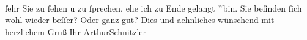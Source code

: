 \begin{ledgroupsized}[t]{13cm}
               ſehr Sie zu ſehen u zu ſprechen, ehe ich zu Ende gelangt \substVorne{}\textsuperscript{\textcolor{gray}{w}}\substDazwischen{}bin\substHinten{}. Sie befinden ſich wohl wieder beſſer? Oder ganz gut? Dies und aehnliches
               wünschend mit herzlichem Gruß Ihr\pend
           \pstart \spacefill\mbox{ArthurSchnitzler}\pend{}
         
         \endnumbering{}\end{ledgroupsized}  \newcommand{\dateiname}{L02245}\newcommand{\titel}{Arthur Schnitzler an Robert Adam, 16. 11. 1916}\newcommand{\editorInnen}{Martin Anton Müller und Gerd-Hermann Susen}
      